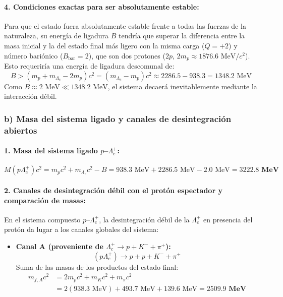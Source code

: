 \begin{problema}
\paragraph{4. Condiciones exactas para ser absolutamente estable:}
Para que el estado fuera absolutamente estable frente a todas las fuerzas de la naturaleza, su energía de ligadura $B$ tendría que superar la diferencia entre la masa inicial y la del estado final más ligero con la misma carga ($Q=+2$) y número bariónico ($B_{\text{bar}}=2$), que son dos protones ($2p$, $2m_p \approx 1876.6\text{ MeV}/c^2$). Esto requeriría una energía de ligadura descomunal de:
\begin{equation*}
B > (m_p + m_{\Lambda_c} - 2m_p) c^2 = (m_{\Lambda_c} - m_p) c^2 \approx 2286.5 - 938.3 = 1348.2\text{ MeV}
\end{equation*}
Como $B \approx 2\text{ MeV} \ll 1348.2\text{ MeV}$, el sistema decaerá inevitablemente mediante la interacción débil.

\subsubsection*{b) Masa del sistema ligado y canales de desintegración abiertos}

\paragraph{1. Masa del sistema ligado $p$--$\Lambda_c^+$:}
\begin{equation*}
M(p\Lambda_c^+) c^2 = m_p c^2 + m_{\Lambda_c} c^2 - B = 938.3\text{ MeV} + 2286.5\text{ MeV} - 2.0\text{ MeV} = \mathbf{3222.8\text{ MeV}}
\end{equation*}

\paragraph{2. Canales de desintegración débil con el protón espectador y comparación de masas:}

En el sistema compuesto $p$--$\Lambda_c^+$, la desintegración débil de la $\Lambda_c^+$ en presencia del protón da lugar a los canales globales del sistema:

\begin{itemize}
    \item \textbf{Canal A (proveniente de $\Lambda_c^+ \to p + K^- + \pi^+$):}
    \begin{equation*}
    (p \Lambda_c^+) \longrightarrow p + p + K^- + \pi^+
    \end{equation*}
    Suma de las masas de los productos del estado final:
    \begin{align*}
    m_{f,A} c^2 &= 2 m_p c^2 + m_K c^2 + m_\pi c^2 \\
    &= 2(938.3\text{ MeV}) + 493.7\text{ MeV} + 139.6\text{ MeV} = \mathbf{2509.9\text{ MeV}}
    \end{align*}


\end{itemize}
\end{problema}
